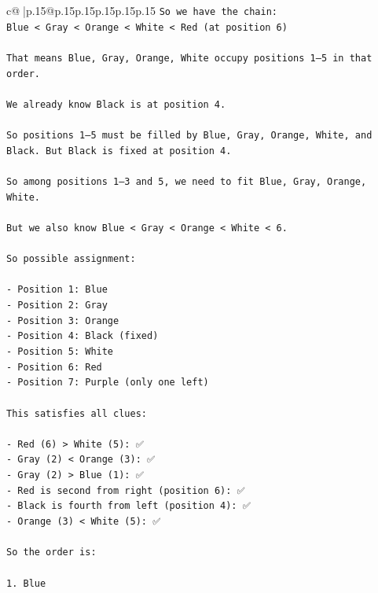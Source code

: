 \documentclass{article}
\begin{document}
{\begin{supertabular}{c@{$\;$}|p{.15\linewidth}@{}p{.15\linewidth}p{.15\linewidth}p{.15\linewidth}p{.15\linewidth}p{.15\linewidth}}
{{{\texttt{So we have the chain:  } \\
\texttt{Blue < Gray < Orange < White < Red (at position 6)} \\
\\ 
\texttt{That means Blue, Gray, Orange, White occupy positions 1–5 in that order.} \\
\\ 
\texttt{We already know Black is at position 4.} \\
\\ 
\texttt{So positions 1–5 must be filled by Blue, Gray, Orange, White, and Black. But Black is fixed at position 4.} \\
\\ 
\texttt{So among positions 1–3 and 5, we need to fit Blue, Gray, Orange, White.} \\
\\ 
\texttt{But we also know Blue < Gray < Orange < White < 6.} \\
\\ 
\texttt{So possible assignment:} \\
\\ 
\texttt{{-} Position 1: Blue  } \\
\texttt{{-} Position 2: Gray  } \\
\texttt{{-} Position 3: Orange  } \\
\texttt{{-} Position 4: Black (fixed)  } \\
\texttt{{-} Position 5: White  } \\
\texttt{{-} Position 6: Red  } \\
\texttt{{-} Position 7: Purple (only one left)} \\
\\ 
\texttt{This satisfies all clues:} \\
\\ 
\texttt{{-} Red (6) > White (5): ✅  } \\
\texttt{{-} Gray (2) < Orange (3): ✅  } \\
\texttt{{-} Gray (2) > Blue (1): ✅  } \\
\texttt{{-} Red is second from right (position 6): ✅  } \\
\texttt{{-} Black is fourth from left (position 4): ✅  } \\
\texttt{{-} Orange (3) < White (5): ✅} \\
\\ 
\texttt{So the order is:} \\
\\ 
\texttt{1. Blue  } \\
}}}
\end{supertabular}}
\end{document}
